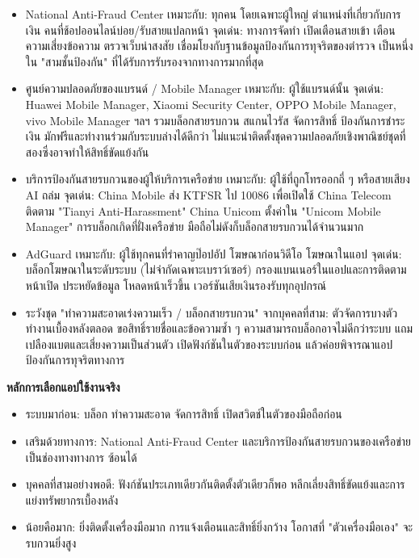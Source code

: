 \begin{itemize}
  \item National Anti-Fraud Center เหมาะกับ: ทุกคน โดยเฉพาะผู้ใหญ่ ตำแหน่งที่เกี่ยวกับการเงิน คนที่ช้อปออนไลน์บ่อย/รับสายแปลกหน้า จุดเด่น: ทางการจัดทำ เปิดเตือนสายเข้า เตือนความเสี่ยงข้อความ ตรวจเว็บน่าสงสัย เชื่อมโยงกับฐานข้อมูลป้องกันการทุจริตของตำรวจ เป็นหนึ่งใน "สามชั้นป้องกัน" ที่ได้รับการรับรองจากทางการมากที่สุด
  \item ศูนย์ความปลอดภัยของแบรนด์ / Mobile Manager เหมาะกับ: ผู้ใช้แบรนด์นั้น จุดเด่น: Huawei Mobile Manager, Xiaomi Security Center, OPPO Mobile Manager, vivo Mobile Manager ฯลฯ รวมบล็อกสายรบกวน สแกนไวรัส จัดการสิทธิ์ ป้องกันการชำระเงิน มักฟรีและทำงานร่วมกับระบบล่างได้ดีกว่า ไม่แนะนำติดตั้งชุดความปลอดภัยเชิงพาณิชย์ชุดที่สองซึ่งอาจทำให้สิทธิ์ขัดแย้งกัน
  \item บริการป้องกันสายรบกวนของผู้ให้บริการเครือข่าย เหมาะกับ: ผู้ใช้ที่ถูกโทรออกถี่ ๆ หรือสายเสียง AI ถล่ม จุดเด่น: China Mobile ส่ง KTFSR ไป 10086 เพื่อเปิดใช้ China Telecom ติดตาม "Tianyi Anti-Harassment" China Unicom ตั้งค่าใน "Unicom Mobile Manager" การบล็อกเกิดที่ฝั่งเครือข่าย มือถือไม่ดังก็บล็อกสายรบกวนได้จำนวนมาก
  \item AdGuard เหมาะกับ: ผู้ใช้ทุกคนที่รำคาญป๊อปอัป โฆษณาก่อนวิดีโอ โฆษณาในแอป จุดเด่น: บล็อกโฆษณาในระดับระบบ (ไม่จำกัดเฉพาะเบราว์เซอร์) กรองแบนเนอร์ในแอปและการติดตามหน้าเปิด ประหยัดข้อมูล โหลดหน้าเร็วขึ้น เวอร์ชันเสียเงินรองรับทุกอุปกรณ์
  \item ระวังชุด "ทำความสะอาดเร่งความเร็ว / บล็อกสายรบกวน" จากบุคคลที่สาม: ตัวจัดการบางตัวทำงานเบื้องหลังตลอด ขอสิทธิ์รายชื่อและข้อความซ้ำ ๆ ความสามารถบล็อกอาจไม่ดีกว่าระบบ แถมเปลืองแบตและเสี่ยงความเป็นส่วนตัว เปิดฟังก์ชันในตัวของระบบก่อน แล้วค่อยพิจารณาแอปป้องกันการทุจริตทางการ
\end{itemize}

\textbf{หลักการเลือกแอปใช้งานจริง}\par

\begin{itemize}
  \item ระบบมาก่อน: บล็อก ทำความสะอาด จัดการสิทธิ์ เปิดสวิตช์ในตัวของมือถือก่อน
  \item เสริมด้วยทางการ: National Anti-Fraud Center และบริการป้องกันสายรบกวนของเครือข่าย เป็นช่องทางทางการ ซ้อนได้
  \item บุคคลที่สามอย่างพอดี: ฟังก์ชันประเภทเดียวกันติดตั้งตัวเดียวก็พอ หลีกเลี่ยงสิทธิ์ขัดแย้งและการแย่งทรัพยากรเบื้องหลัง
  \item น้อยคือมาก: ยิ่งติดตั้งเครื่องมือมาก การแจ้งเตือนและสิทธิ์ยิ่งกว้าง โอกาสที่ "ตัวเครื่องมือเอง" จะรบกวนยิ่งสูง
\end{itemize}


